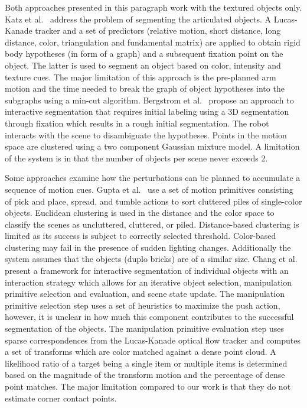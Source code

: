 Both approaches presented in this paragraph work with the textured objects only. 
Katz et  al.~\cite{Katz-WS-MM-ICRA2011} address
the problem of segmenting the articulated objects. A  Lucas-Kanade tracker and a  set of predictors (relative  motion, 
short  distance, long distance, color,  triangulation and  fundamental matrix) are applied 
 to obtain rigid  body hypotheses (in form of a graph) and  
a subsequent fixation point  on the object. The latter is used to  
segment an object based on color, intensity and texture cues. The major limitation 
of this approach is the pre-planned arm motion and the time needed to break
the graph of object hypotheses into the subgraphs using a min-cut algorithm.
Bergstrom  et  al.~\cite{bergstrom11icvs}   propose  an   approach  to
interactive  segmentation that  requires initial  labeling using  a 3D
segmentation  through  fixation  which  results  in  a  rough  initial
segmentation. The robot interacts with the scene to disambiguate
the hypotheses.   Points in the motion space
are clustered using a two component Gaussian  mixture model. A limitation
of the system is in that the number of objects per scene never exceeds 2.

Some approaches examine how the perturbations 
can be planned to accumulate a sequence of motion cues. Gupta et al.~\cite{gupta11primitives}
use a set of motion primitives consisting of pick and place, spread, and
tumble actions to sort cluttered piles of single-color objects.
 Euclidean clustering is used in the distance
and the color space to classify the scenes as uncluttered, cluttered, 
or piled.  Distance-based clustering is limited as its success is subject
to  correctly selected threshold. Color-based clustering may fail
in the presence of sudden lighting changes. Additionally the system
assumes that the objects (duplo bricks) are of a similar size.
Chang et al.~\cite{chang11interactive}
present a framework for interactive segmentation of individual objects
with an interaction strategy which allows for an iterative object
selection, manipulation primitive selection and evaluation, and scene state 
update. The manipulation primitive selection step uses a set of heuristics
to maximize the push action, however, it is unclear in how much this component contributes to the successful segmentation of the objects. 
The manipulation primitive evaluation step uses sparse correspondences from the Lucas-Kanade optical flow tracker and 
computes a set of transforms which are color matched against a dense point cloud.
A likelihood ratio of a target being a single item or multiple items is determined 
based on the magnitude of the transform motion and the percentage of
dense point matches. The major limitation compared to our work is that they
do not estimate corner contact points. 

